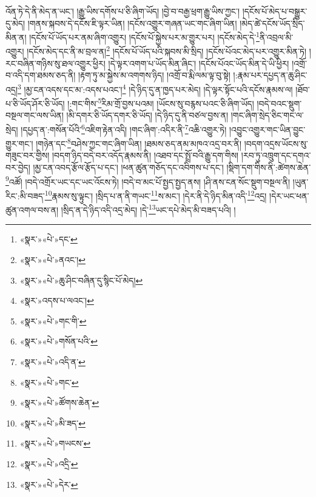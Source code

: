 འོན་ཏེ་དེ་ནི་མེད་ན་ཡང་། །རྒྱུ་ཡིས་དགོས་པ་ཅི་ཞིག་ཡོད། །བྱེ་བ་བརྒྱ་ཕྲག་རྒྱུ་ཡིས་ཀྱང་། །དངོས་པོ་མེད་པ་བསྒྱུར་དུ་མེད། །གནས་སྐབས་དེ་དངོས་ཇི་ལྟར་ཡིན། །དངོས་འགྱུར་གཞན་ཡང་གང་ཞིག་ཡིན། །མེད་ཚེ་དངོས་ཡོད་སྲིད་མིན་ན། །དངོས་པོ་ཡོད་པར་ནམ་ཞིག་འགྱུར། །དངོས་པོ་སྐྱེས་པར་མ་གྱུར་པར། །དངོས་མེད་དེ་\footnote{«སྣར་»«པེ་»དང་}ནི་འབྲལ་མི་འགྱུར། །དངོས་མེད་དང་ནི་མ་བྲལ་ན།\footnote{«སྣར་»«པེ་»ནའང་།} །དངོས་པོ་ཡོད་པའི་སྐབས་མི་སྲིད། །དངོས་པོའང་མེད་པར་འགྱུར་མིན་ཏེ། །རང་བཞིན་གཉིས་སུ་ཐལ་འགྱུར་ཕྱིར། །དེ་ལྟར་འགག་པ་ཡོད་མིན་ཞིང་། །དངོས་པོའང་ཡོད་མིན་དེ་ཡི་ཕྱིར། །འགྲོ་བ་འདི་དག་ཐམས་ཅད་ནི། །རྟག་ཏུ་མ་སྐྱེས་མ་འགགས་ཉིད། །འགྲོ་བ་རྨི་ལམ་ལྟ་བུ་སྟེ། །:རྣམ་པར་དཔྱད་ན་ཆུ་ཤིང་འདྲ།\footnote{«སྣར་»«པེ་»ཆུ་ཤིང་བཞིན་དུ་སྙིང་པོ་མེད།} །མྱ་ངན་འདས་དང་མ་:འདས་པའང་།\footnote{«སྣར་»འདས་པ་ལའང་།} །དེ་ཉིད་དུ་ན་ཁྱད་པར་མེད། །དེ་ལྟར་སྟོང་པའི་དངོས་རྣམས་ལ། །ཐོབ་པ་ཅི་ཡོད་ཤོར་ཅི་ཡོད། །:གང་གིས་\footnote{«སྣར་»«པེ་»གང་གི་}རིམ་གྲོ་བྱས་པའམ། །ཡོངས་སུ་བརྙས་པའང་ཅི་ཞིག་ཡོད། །བདེ་བའང་སྡུག་བསྔལ་གང་ལས་ཡིན། །མི་དགར་ཅི་ཡོད་དགར་ཅི་ཡོད། །དེ་ཉིད་དུ་ནི་བཙལ་བྱས་ན། །གང་ཞིག་སྲེད་ཅིང་གང་ལ་སྲེད། །དཔྱད་ན་:གསོན་པོའི་\footnote{«སྣར་»«པེ་»གསོན་པའི་}འཇིག་རྟེན་འདི། །གང་ཞིག་:འདིར་ནི་\footnote{«སྣར་»«པེ་»འདི་ན་}འཆི་འགྱུར་ཏེ། །འབྱུང་འགྱུར་གང་ཡིན་བྱུང་གྱུར་གང་། །གཉེན་དང་\footnote{«སྣར་»«པེ་»གང་}བཤེས་ཀྱང་གང་ཞིག་ཡིན། །ཐམས་ཅད་ནམ་མཁའ་འདྲ་བར་ནི། །བདག་འདྲས་ཡོངས་སུ་གཟུང་བར་གྱིས། །བདག་ཉིད་བདེ་བར་འདོད་རྣམས་ནི། །འཐབ་དང་སྤྲོ་བའི་རྒྱུ་དག་གིས། །རབ་ཏུ་འཁྲུག་དང་དགའ་བར་བྱེད། །མྱ་ངན་འབད་རྩོལ་རྩོད་པ་དང་། །ཕན་ཚུན་གཅོད་དང་འབིགས་པ་དང་། །སྡིག་དག་གིས་ནི་:ཚེགས་ཆེན་\footnote{«སྣར་»«པེ་»ཚོགས་ཆེན་}འཚོ། །བདེ་འགྲོར་ཡང་དང་ཡང་འོངས་ཏེ། །བདེ་བ་མང་པོ་སྤྱད་སྤྱད་ནས། །ཤི་ནས་ངན་སོང་སྡུག་བསྔལ་ནི། །ཡུན་རིང་:མི་བཟད་\footnote{«སྣར་»«པེ་»མི་ཟད་}རྣམས་སུ་ལྟུང་། །སྲིད་པ་ན་ནི་གཡང་\footnote{«སྣར་»«པེ་»གཡངས་}ས་མང་། །དེར་ནི་དེ་ཉིད་མིན་འདི་\footnote{«སྣར་»«པེ་»འདྲི་}འདྲ། །དེར་ཡང་ཕན་ཚུན་འགལ་བས་ན། །སྲིད་ན་དེ་ཉིད་འདི་འདྲ་མེད། །དེ་\footnote{«སྣར་»«པེ་»དེར་}ཡང་དཔེ་མེད་མི་བཟད་པའི། །
